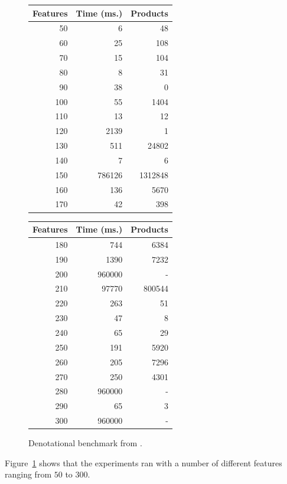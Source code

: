 \begin{figure}[t]
	\centering
	\begin{minipage}{0.4\hsize}
	\begin{tabular}{|rrr|}
			\hline
		Features&       Time (ms.)&    Products\\
			\hline
		50 & 6 & 48 \\
		60 & 25 & 108 \\
		70 & 15 & 104 \\
		80 & 8 & 31 \\
		90 & 38 & 0 \\
		100 & 55 & 1404 \\
		110 & 13 & 12 \\
		120 & 2139 & 1 \\
		130 & 511 & 24802 \\
		140 & 7 & 6 \\
		150 & 786126 & 1312848 \\
		160 & 136 & 5670 \\
		170 & 42 & 398 \\
		\hline
	\end{tabular}
	\end{minipage}
	\begin{minipage}{0.4\hsize}
	\begin{tabular}{|rrr|}
		\hline
		Features&       Time (ms.)&    Products\\
			\hline		
180 & 744 & 6384 \\
190 & 1390 & 7232 \\
200 & 960000 & - \\
210 & 97770 & 800544 \\
220 & 263 & 51 \\
230 & 47 & 8 \\
240 & 65 & 29 \\
250 & 191 & 5920 \\
260 & 205 & 7296 \\
270 & 250 & 4301 \\
280 & 960000 & - \\
290 & 65 & 3 \\
300 & 960000 & - \\
		\hline
	\end{tabular}
	\end{minipage}
	\caption{Denotational benchmark from \cite{acl13}.\label{figure:tool:den:benchmark}}
\end{figure}




Figure~\ref{figure:tool:den:benchmark} shows that
the experiments ran with a number of different
features ranging from $50$ to $300$.

